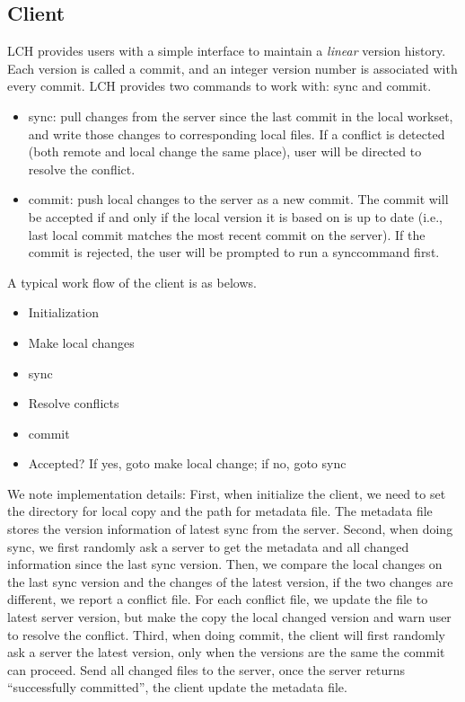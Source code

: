 \documentclass[11pt]{article}
\begin{document}
\subsection{Client}

LCH provides users with a simple interface to maintain a \emph{linear} version history. Each version is called a commit, and an integer version number is associated with every commit. LCH provides two commands to work with: sync and commit. 
\begin{itemize}
  \item sync: pull changes from the server since the last commit in the local workset, and write those changes to corresponding local files. If a conflict is detected (both remote and local change the same place), user will be directed to resolve the conflict.
  \item commit: push local changes to the server as a new commit. The commit will be accepted if and only if the local version it is based on is up to date (i.e., last local commit matches the most recent commit on the server). If the commit is rejected, the user will be prompted to run a synccommand first.

\end{itemize}
A typical work flow of the client is as belows.
\begin{itemize}
  \item Initialization
  \item Make local changes
  \item sync
  \item Resolve conflicts
  \item commit
  \item Accepted? If yes, goto make local change; if no, goto sync
\end{itemize}

We note implementation details: First, when initialize the client, we need to set the directory for local copy and the path for metadata file. The metadata file stores the version information of latest sync from the server. Second, when doing sync, we first randomly ask a server to get the metadata and all changed information since the last sync version. Then, we compare the local changes on the last sync version and the changes of the latest version, if the two changes are different, we report a conflict file. For each conflict file, we update the file to latest server version, but make the copy the local changed version and warn user to resolve the conflict. Third, when doing commit, the client will first randomly ask a server the latest version, only when the versions are the same the commit can proceed. Send all changed files to the server, once the server returns ``successfully committed'', the client update the metadata file.
\end{document}
